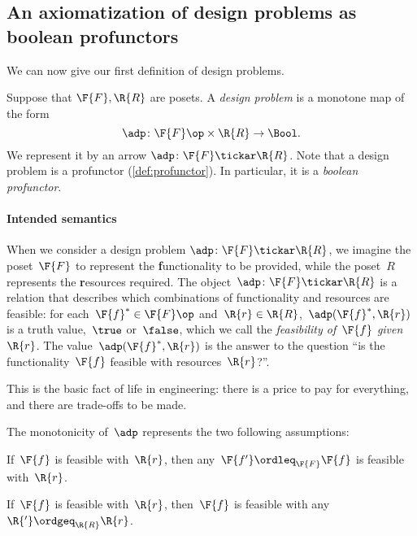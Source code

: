 \label{sec:dpdefinition}


\subsection{An axiomatization of design problems as boolean profunctors}
We can now give our first definition of design problems.



\begin{definition} \label{def:design-problem}
Suppose that $\F{F}, \R{R}$ are posets. A \emph{design problem} is a monotone map of the form
\begin{equation}
	\adp \colon  \F{F}\op \times \R{R} \to \Bool.
\end{equation}
We represent it by an arrow $\adp \colon \F{F} \tickar \R{R}$. Note that a design problem is a profunctor (\cref{def:profunctor}). In particular, it is a \emph{boolean profunctor}.
\end{definition}

\paragraph{Intended semantics}
When we consider a design problem $\adp\colon \F{F} \tickar \R{R}$, we imagine the poset~$\F{F}$ to represent the \textbf{f}unctionality to be provided, while the poset~$R$ represents the \textbf{r}esources required. The object~$\adp \colon \F{F} \tickar \R{R}$ is a relation that describes which combinations of functionality and resources are feasible: for each~$\F{f}^* \in \F{F}\op$ and~$\R{r} \in \R{R}$,~$\adp(\F{f}^*,\R{r})$ is a truth value,~$\true$ or~$\false$, which we call the \emph{feasibility of~$\F{f}$ given~$\R{r}$}. The value~$\adp(\F{f}^*,\R{r})$ is the answer to the question ``is the functionality~$\F{f}$ feasible with resources~$\R{r}$?''.

This is the basic fact of life in engineering: there is a price to pay for everything, and there are trade-offs to be made.

The monotonicity of~$\adp$ represents the two following assumptions:

\begin{compactenum}
\item If~$\F{f}$ is feasible with~$\R{r}$, then any~$\F{f'} \ordleq_\F{F} \F{f}$ is feasible with~$\R{r}$.
\item If~$\F{f}$ is feasible with~$\R{r}$, then~$\F{f}$ is feasible with any~$\R{'} \ordgeq_\R{R} \R{r}$.
\end{compactenum}

